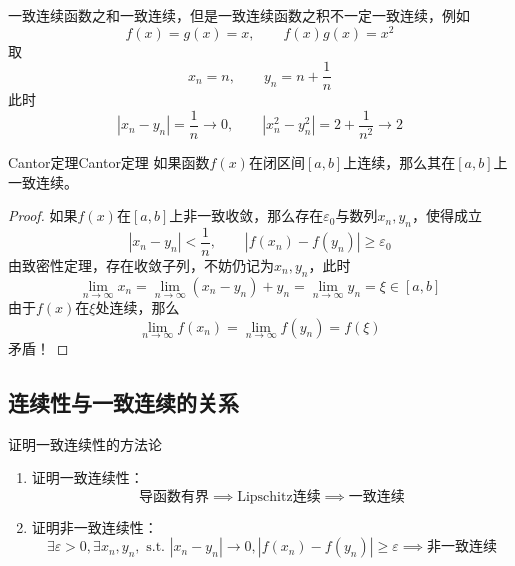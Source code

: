 \documentclass[lang = cn, scheme = chinese, thmcnt = section]{elegantbook}
\begin{document}
\begin{note}
	一致连续函数之和一致连续，但是一致连续函数之积不一定一致连续，例如
	$$
	f(x)=g(x)=x,\qquad 
	f(x)g(x)=x^2
	$$
	取
	$$
	x_n=n,\qquad y_n=n+\frac{1}{n}
	$$
	此时
	$$
	|x_n-y_n|=\frac{1}{n}\to 0,\qquad
	|x_n^2-y_n^2|=2+\frac{1}{n^2}\to 2
	$$
\end{note}

\begin{theorem}{Cantor定理}{Cantor定理}
	如果函数$f(x)$在闭区间$[a,b]$上连续，那么其在$[a,b]$上一致连续。
\end{theorem}

\begin{proof}
	如果$f(x)$在$[a,b]$上非一致收敛，那么存在$\varepsilon_0$与数列$x_n,y_n$，使得成立
	$$
	|x_n-y_n|<\frac{1}{n},\qquad 
	|f(x_n)-f(y_n)|\ge\varepsilon_0
	$$
	由致密性定理，存在收敛子列，不妨仍记为$x_n,y_n$，此时
	$$
	\lim_{n\to\infty}x_n
	=\lim_{n\to\infty}(x_n-y_n)+y_n
	=\lim_{n\to\infty}y_n
	=\xi\in [a,b]
	$$
	由于$f(x)$在$\xi$处连续，那么
	$$
	\lim_{n\to\infty}f(x_n)
	=\lim_{n\to\infty}f(y_n)
	=f(\xi)
	$$
	矛盾！
\end{proof}

\subsection{连续性与一致连续的关系}

\begin{proposition}{证明一致连续性的方法论}
	\begin{enumerate}
		\item 证明一致连续性：
		$$
		\text{导函数有界}\implies
		\text{Lipschitz连续}\implies
		\text{一致连续}
		$$
		\item 证明非一致连续性：
		$$
		\exists\varepsilon>0,\exists x_n,y_n,\text{ s.t. } |x_n-y_n|\to 0,|f(x_n)-f(y_n)|\ge\varepsilon\implies\text{非一致连续}
		$$
	\end{enumerate}
\end{proposition}
\end{document}
